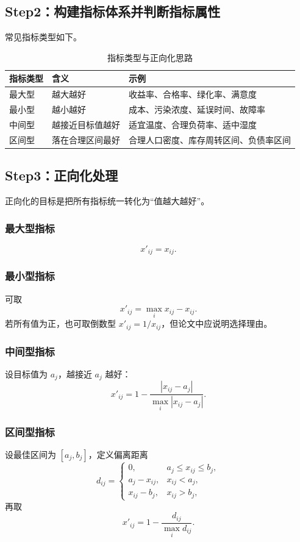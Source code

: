 \documentclass[UTF8,a4paper,11pt]{ctexart}
\begin{document}
\subsection{Step2：构建指标体系并判断指标属性}
常见指标类型如下。
\begin{table}[h]
\centering
\caption{指标类型与正向化思路}
\begin{tabular}{p{2.6cm}p{4.8cm}p{5.8cm}}
\toprule
指标类型 & 含义 & 示例 \\
\midrule
最大型 & 越大越好 & 收益率、合格率、绿化率、满意度 \\
最小型 & 越小越好 & 成本、污染浓度、延误时间、故障率 \\
中间型 & 越接近目标值越好 & 适宜温度、合理负荷率、适中湿度 \\
区间型 & 落在合理区间最好 & 合理人口密度、库存周转区间、负债率区间 \\
\bottomrule
\end{tabular}
\end{table}

\subsection{Step3：正向化处理}
正向化的目标是把所有指标统一转化为“值越大越好”。

\subsubsection{最大型指标}
\[
x'_{ij}=x_{ij}.
\]

\subsubsection{最小型指标}
可取
\[
x'_{ij}=\max_i x_{ij}-x_{ij}.
\]
若所有值为正，也可取倒数型 $x'_{ij}=1/x_{ij}$，但论文中应说明选择理由。

\subsubsection{中间型指标}
设目标值为 $a_j$，越接近 $a_j$ 越好：
\[
x'_{ij}=1-\frac{|x_{ij}-a_j|}{\max_i |x_{ij}-a_j|}.
\]

\subsubsection{区间型指标}
设最佳区间为 $[a_j,b_j]$，定义偏离距离
\[
d_{ij}=\begin{cases}
0, & a_j\le x_{ij}\le b_j,\\
a_j-x_{ij}, & x_{ij}<a_j,\\
x_{ij}-b_j, & x_{ij}>b_j,
\end{cases}
\]
再取
\[
x'_{ij}=1-\frac{d_{ij}}{\max_i d_{ij}}.
\]
\end{document}
